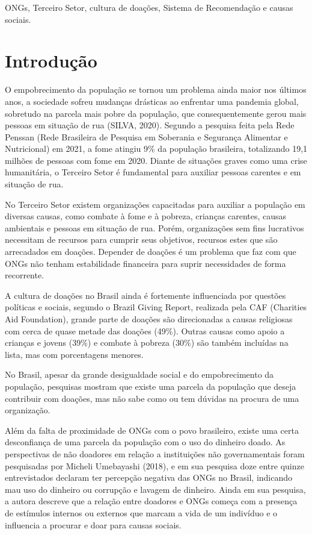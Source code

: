 \documentclass[conference]{IEEEtran}
\begin{document}
\begin{IEEEkeywords}
ONGs, Terceiro Setor, cultura de doações, Sistema de Recomendação e causas sociais.
\end{IEEEkeywords}

\section{Introdução}
O empobrecimento da população se tornou um problema ainda maior nos últimos anos, a sociedade sofreu mudanças drásticas ao enfrentar uma pandemia global, sobretudo na parcela mais pobre da população, que consequentemente gerou mais pessoas em situação de rua (SILVA, 2020). Segundo a pesquisa feita pela Rede Penssan (Rede Brasileira de Pesquisa em Soberania e Segurança Alimentar e Nutricional) em 2021, a fome atingiu 9\% da população brasileira, totalizando 19,1 milhões de pessoas com fome em 2020. Diante de situações graves como uma crise humanitária, o Terceiro Setor é fundamental para auxiliar pessoas carentes e em situação de rua.

No Terceiro Setor existem organizações capacitadas para auxiliar a população em diversas causas, como combate à fome e à pobreza, crianças carentes, causas ambientais e pessoas em situação de rua. Porém, organizações sem fins lucrativos necessitam de recursos para cumprir seus objetivos, recursos estes que são arrecadados em doações. Depender de doações é um problema que faz com que ONGs não tenham estabilidade financeira para suprir necessidades de forma recorrente. 

A cultura de doações no Brasil ainda é fortemente influenciada por questões políticas e sociais, segundo o Brazil Giving Report, realizada pela CAF (Charities Aid Foundation), grande parte de doações são direcionadas a causas religiosas com cerca de quase metade das doações (49\%). Outras causas como apoio a crianças e jovens (39\%) e combate à pobreza (30\%) são também incluídas na lista, mas com porcentagens menores. 

No Brasil, apesar da grande desigualdade social e do empobrecimento da população, pesquisas mostram que existe uma parcela da população que deseja contribuir com doações, mas não sabe como ou tem dúvidas na procura de uma organização. 

Além da falta de proximidade de ONGs com o povo brasileiro, existe uma certa desconfiança de uma parcela da população com o uso do dinheiro doado. As perspectivas de não doadores em relação a instituições não governamentais foram pesquisadas por Micheli Umebayashi (2018), e em sua pesquisa doze entre quinze entrevistados declaram ter percepção negativa das ONGs no Brasil, indicando mau uso do dinheiro ou corrupção e lavagem de dinheiro. Ainda em sua pesquisa, a autora descreve que a relação entre doadores e ONGs começa com a presença de estímulos internos ou externos que marcam a vida de um indivíduo e o influencia a procurar e doar para causas sociais. \cite{umebayashi2018doaccoes}
\end{document}
